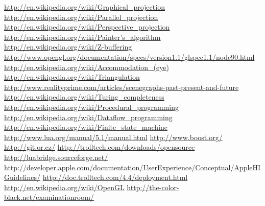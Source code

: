 \begin{thebibliography}{12}
 \url{http://en.wikipedia.org/wiki/Graphical_projection}
 \url{http://en.wikipedia.org/wiki/Parallel_projection}
 \url{http://en.wikipedia.org/wiki/Perspective_projection}
 \url{http://en.wikipedia.org/wiki/Painter's_algorithm}
 \url{http://en.wikipedia.org/wiki/Z-buffering}
 \url{http://www.opengl.org/documentation/specs/version1.1/glspec1.1/node90.html}
 \url{http://en.wikipedia.org/wiki/Accommodation_(eye)}
 \url{http://en.wikipedia.org/wiki/Triangulation}
 \url{http://www.realityprime.com/articles/scenegraphs-past-present-and-future}
 \url{http://en.wikipedia.org/wiki/Turing_completeness}
 \url{http://en.wikipedia.org/wiki/Procedural_programming}
 \url{http://en.wikipedia.org/wiki/Dataflow_programming}
 \url{http://en.wikipedia.org/wiki/Finite_state_machine}
 \url{http://www.lua.org/manual/5.1/manual.html}
 \url{http://www.boost.org/}
 \url{http://git.or.cz/}
 \url{http://trolltech.com/downloads/opensource}
 \url{http://luabridge.sourceforge.net/}
 \url{http://developer.apple.com/documentation/UserExperience/Conceptual/AppleHIGuidelines/}
 \url{http://doc.trolltech.com/4.4/deployment.html}
 \url{http://en.wikipedia.org/wiki/OpenGL}
 \url{http://the-color-black.net/examinationroom/}
\end{thebibliography}
